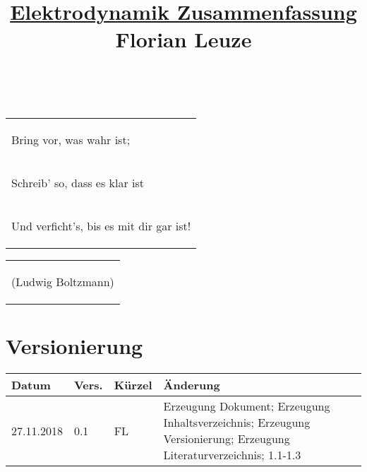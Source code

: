 \documentclass[12pt,a4paper]{report}%
\numberwithin{equation}{section}
\numberwithin{equation}{section}
\begin{document}


\author{}
\title{\underline{Elektrodynamik Zusammenfassung} \\ $\;$ \\ $\;$ \\ Florian Leuze}
\date{}
\maketitle %

$\;$ \newline
$\;$ \newline
$\;$ \newline
$\;$ \newline
$\;$ \newline
$\;$ \newline
$\;$ \newline
$\;$ \newline
$\;$ \newline
$\;$ \newline
$\;$ \newline
$\;$ \newline
\begin{table}[H]
  \centering
  \begin{tabular}{P{14cm}}
    \begin{LARGE}
		  \glqq Bring vor, was wahr ist; 
    \end{LARGE}\\
    \begin{LARGE}
		   Schreib' so, dass es klar ist
    \end{LARGE}\\
    \begin{LARGE}
		   Und verficht's, bis es mit dir gar ist!\grqq
    \end{LARGE}
  \end{tabular}
  \begin{tabular}{l}
    \begin{large}
      (Ludwig Boltzmann)
    \end{large}
  \end{tabular}
\end{table}

\newpage
\tableofcontents

\section*{Versionierung}
\begin{tabular}{|p{2cm}|p{1cm}|p{1.5cm}|p{8.5cm}|}\hline
Datum & Vers. & Kürzel & Änderung \\ \hline
27.11.2018 & 0.1 & FL & Erzeugung Dokument; Erzeugung Inhaltsverzeichnis; Erzeugung Versionierung; Erzeugung Literaturverzeichnis; 1.1-1.3\\ \hline
\end{tabular}
\listoffigures
\end{document}
